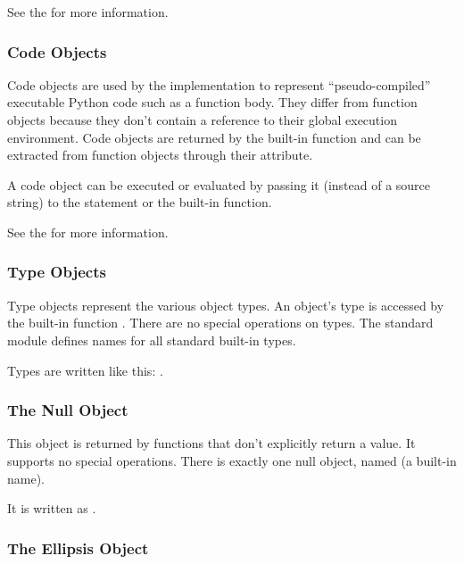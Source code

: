 See the  for more
information.


\subsubsection{Code Objects \label{bltin-code-objects}}

Code objects are used by the implementation to represent
``pseudo-compiled'' executable Python code such as a function body.
They differ from function objects because they don't contain a
reference to their global execution environment.  Code objects are
returned by the built-in  function and can be
extracted from function objects through their 
attribute.

A code object can be executed or evaluated by passing it (instead of a
source string) to the  statement or the built-in
 function.

See the  for more
information.


\subsubsection{Type Objects \label{bltin-type-objects}}

Type objects represent the various object types.  An object's type is
accessed by the built-in function .  There are no special
operations on types.  The standard module  defines names
for all standard built-in types.

Types are written like this: .


\subsubsection{The Null Object \label{bltin-null-object}}

This object is returned by functions that don't explicitly return a
value.  It supports no special operations.  There is exactly one null
object, named  (a built-in name).

It is written as .


\subsubsection{The Ellipsis Object \label{bltin-ellipsis-object}}

